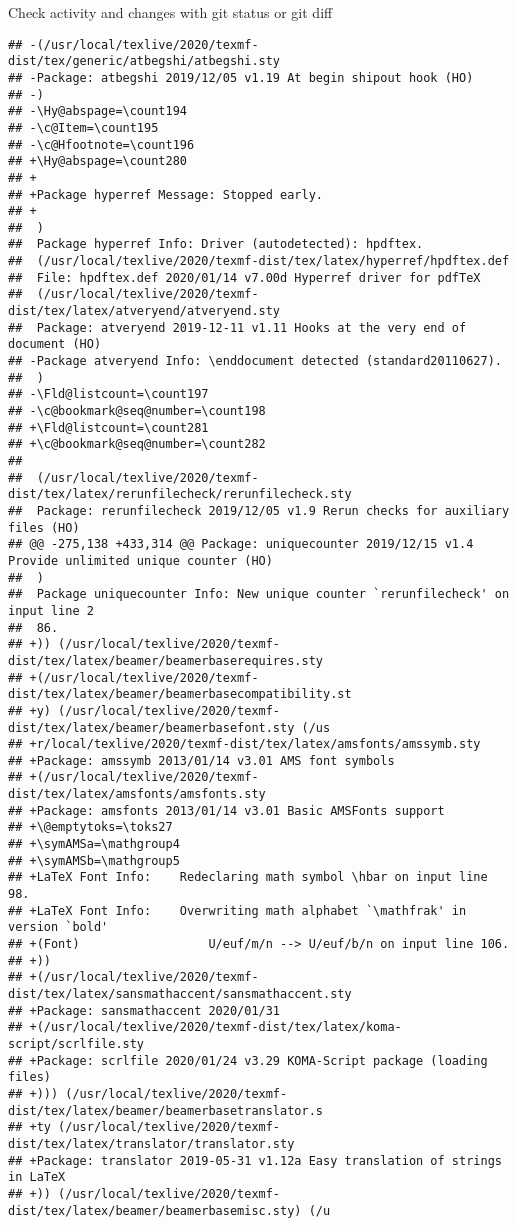 \documentclass[ignorenonframetext,]{beamer}
\begin{document}
\begin{frame}[fragile]{Check activity and changes with git status or git
diff}
\begin{verbatim}
## -(/usr/local/texlive/2020/texmf-dist/tex/generic/atbegshi/atbegshi.sty
## -Package: atbegshi 2019/12/05 v1.19 At begin shipout hook (HO)
## -)
## -\Hy@abspage=\count194
## -\c@Item=\count195
## -\c@Hfootnote=\count196
## +\Hy@abspage=\count280
## +
## +Package hyperref Message: Stopped early.
## +
##  )
##  Package hyperref Info: Driver (autodetected): hpdftex.
##  (/usr/local/texlive/2020/texmf-dist/tex/latex/hyperref/hpdftex.def
##  File: hpdftex.def 2020/01/14 v7.00d Hyperref driver for pdfTeX
##  (/usr/local/texlive/2020/texmf-dist/tex/latex/atveryend/atveryend.sty
##  Package: atveryend 2019-12-11 v1.11 Hooks at the very end of document (HO)
## -Package atveryend Info: \enddocument detected (standard20110627).
##  )
## -\Fld@listcount=\count197
## -\c@bookmark@seq@number=\count198
## +\Fld@listcount=\count281
## +\c@bookmark@seq@number=\count282
##  
##  (/usr/local/texlive/2020/texmf-dist/tex/latex/rerunfilecheck/rerunfilecheck.sty
##  Package: rerunfilecheck 2019/12/05 v1.9 Rerun checks for auxiliary files (HO)
## @@ -275,138 +433,314 @@ Package: uniquecounter 2019/12/15 v1.4 Provide unlimited unique counter (HO)
##  )
##  Package uniquecounter Info: New unique counter `rerunfilecheck' on input line 2
##  86.
## +)) (/usr/local/texlive/2020/texmf-dist/tex/latex/beamer/beamerbaserequires.sty
## +(/usr/local/texlive/2020/texmf-dist/tex/latex/beamer/beamerbasecompatibility.st
## +y) (/usr/local/texlive/2020/texmf-dist/tex/latex/beamer/beamerbasefont.sty (/us
## +r/local/texlive/2020/texmf-dist/tex/latex/amsfonts/amssymb.sty
## +Package: amssymb 2013/01/14 v3.01 AMS font symbols
## +(/usr/local/texlive/2020/texmf-dist/tex/latex/amsfonts/amsfonts.sty
## +Package: amsfonts 2013/01/14 v3.01 Basic AMSFonts support
## +\@emptytoks=\toks27
## +\symAMSa=\mathgroup4
## +\symAMSb=\mathgroup5
## +LaTeX Font Info:    Redeclaring math symbol \hbar on input line 98.
## +LaTeX Font Info:    Overwriting math alphabet `\mathfrak' in version `bold'
## +(Font)                  U/euf/m/n --> U/euf/b/n on input line 106.
## +))
## +(/usr/local/texlive/2020/texmf-dist/tex/latex/sansmathaccent/sansmathaccent.sty
## +Package: sansmathaccent 2020/01/31
## +(/usr/local/texlive/2020/texmf-dist/tex/latex/koma-script/scrlfile.sty
## +Package: scrlfile 2020/01/24 v3.29 KOMA-Script package (loading files)
## +))) (/usr/local/texlive/2020/texmf-dist/tex/latex/beamer/beamerbasetranslator.s
## +ty (/usr/local/texlive/2020/texmf-dist/tex/latex/translator/translator.sty
## +Package: translator 2019-05-31 v1.12a Easy translation of strings in LaTeX
## +)) (/usr/local/texlive/2020/texmf-dist/tex/latex/beamer/beamerbasemisc.sty) (/u

\end{verbatim}
\end{frame}
\end{document}
